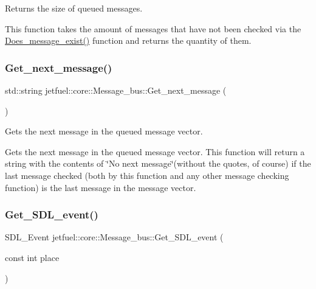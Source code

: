 Returns the size of queued messages. 

This function takes the amount of messages that have not been checked via the \hyperlink{classjetfuel_1_1core_1_1Message__bus_a9bbbbea3cd97a8f8253e08b700dbd05d}{Does\+\_\+message\+\_\+exist()} function and returns the quantity of them. \mbox{\label{classjetfuel_1_1core_1_1Message__bus_ae79fcd8945a1d72bbebc838be6d23a1f}} 
\subsubsection{\texorpdfstring{Get\+\_\+next\+\_\+message()}{Get\_next\_message()}}
{\footnotesize\ttfamily std\+::string jetfuel\+::core\+::\+Message\+\_\+bus\+::\+Get\+\_\+next\+\_\+message (\begin{DoxyParamCaption}{ }\end{DoxyParamCaption})}



Gets the next message in the queued message vector. 

Gets the next message in the queued message vector. This function will return a string with the contents of \char`\"{}\+No next message\char`\"{}(without the quotes, of course) if the last message checked (both by this function and any other message checking function) is the last message in the message vector. \mbox{\label{classjetfuel_1_1core_1_1Message__bus_ab80c8b51aca00ad4942ee2114fdf2fec}} 
\subsubsection{\texorpdfstring{Get\+\_\+\+S\+D\+L\+\_\+event()}{Get\_SDL\_event()}}
{\footnotesize\ttfamily S\+D\+L\+\_\+\+Event jetfuel\+::core\+::\+Message\+\_\+bus\+::\+Get\+\_\+\+S\+D\+L\+\_\+event (\begin{DoxyParamCaption}\item[{const int}]{place }\end{DoxyParamCaption})\hspace{0.3cm}{\ttfamily [inline]}}




